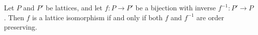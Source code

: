 Let $P$ and $P'$ be lattices, and let $f: P \to P'$ be a bijection with inverse $f^{-1}: P' \to P$. Then $f$ is a lattice isomorphism if and only if both $f$ and $f^{-1}$ are order preserving.
